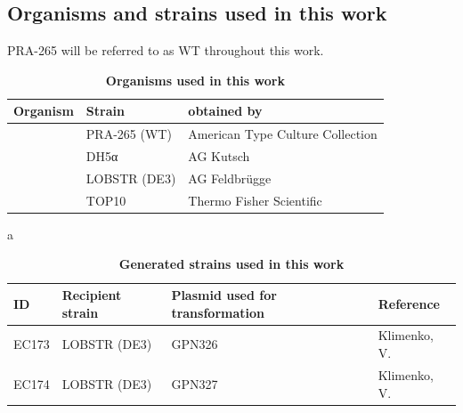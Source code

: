 \subsection{Organisms and strains used in this work}
 PRA-265 will be referred to as \gls{WT} throughout this work.
\begin{table}[H]
        \caption{\textbf{Organisms used in this work}}
        \label{tab:organism_list}
\begin{threeparttable}
        \begin{tabular}{|Y{3.9cm}|Y{4cm}|Y{6cm}|}
            \hline
                \textbf{Organism} & \textbf{Strain} & \textbf{obtained by} \\  
            \hline
                \textbf{} 
                    &  PRA-265 (\gls{WT}) &  American Type Culture Collection \\
                    &  DH5\textgreek{α}  & AG Kutsch \\
              & LOBSTR (DE3)  & AG Feldbrügge \\
             & TOP10 & Thermo Fisher Scientific  \\
                
            \hline
        \end{tabular}
\begin{tablenotes}
\item[a] \cite{andersen_optimized_2013}
\end{tablenotes}

\end{threeparttable}
\end{table}
\begin{table}[H]
        \caption{\textbf{Generated  strains used in this work}}
        \label{tab:Eco_list}
        \begin{tabular}{|Y{1.6cm}|Y{3cm}|Y{5.5cm}|Y{3cm}|}
            \hline
                \textbf{ID} & \textbf{Recipient strain} & \textbf{Plasmid used for transformation} & \textbf{Reference} \\  
            \hline
                EC173 & LOBSTR (DE3) & GPN326 & Klimenko, V. \\
                EC174 & LOBSTR (DE3) & GPN327 & Klimenko, V. \\
            \hline
        \end{tabular}
    \end{table}
